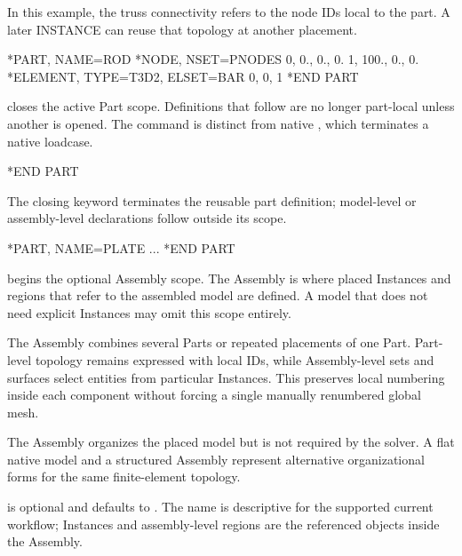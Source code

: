 In this example, the truss connectivity refers to the node IDs local to the part. A later INSTANCE can reuse that topology at another placement.

\exampleheading

\begin{inputdeck}
*PART, NAME=ROD
*NODE, NSET=PNODES
0,   0., 0., 0.
1, 100., 0., 0.
*ELEMENT, TYPE=T3D2, ELSET=BAR
0, 0, 1
*END PART
\end{inputdeck}



 closes the active Part scope. Definitions that follow are no longer part-local unless another  is opened. The command is distinct from native , which terminates a native loadcase.

\syntaxheading

\begin{syntax}
*END PART
\end{syntax}

The closing keyword terminates the reusable part definition; model-level or assembly-level declarations follow outside its scope.

\exampleheading

\begin{inputdeck}
*PART, NAME=PLATE
...
*END PART
\end{inputdeck}


 begins the optional Assembly scope. The Assembly is where placed Instances and regions that refer to the assembled model are defined. A model that does not need explicit Instances may omit this scope entirely.

The Assembly combines several Parts or repeated placements of one Part. Part-level topology remains expressed with local IDs, while Assembly-level sets and surfaces select entities from particular Instances. This preserves local numbering inside each component without forcing a single manually renumbered global mesh.

The Assembly organizes the placed model but is not required by the solver. A flat native model and a structured Assembly represent alternative organizational forms for the same finite-element topology.

 is optional and defaults to . The name is descriptive for the supported current workflow; Instances and assembly-level regions are the referenced objects inside the Assembly.

